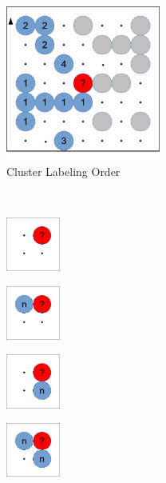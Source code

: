 \begin{figure}
	\centering
	\begin{subfigure}{0.45\textwidth}
		\centering
		\includegraphics[width=2.0in]{17.Metropolis/cluster_labeling.pdf}
		\caption{Cluster Labeling Order}
		\label{fig:cluster_label}
	\end{subfigure}
\\
	\begin{subfigure}{0.15\textwidth}
		\centering
		\includegraphics[width=0.7in]{17.Metropolis/cluster_new.pdf}
		\caption{ }
		\label{fig:cluster_new}
	\end{subfigure}
	\begin{subfigure}{0.15\textwidth}
		\centering
		\includegraphics[width=0.7in]{17.Metropolis/cluster_left.pdf}
		\caption{ }
		\label{fig:cluster_left}
	\end{subfigure}
	\begin{subfigure}{0.15\textwidth}
		\centering
		\includegraphics[width=0.7in]{17.Metropolis/cluster_down.pdf}
		\caption{}
		\label{fig:cluster_down}
	\end{subfigure}
	\begin{subfigure}{0.15\textwidth}
		\centering
		\includegraphics[width=0.7in]{17.Metropolis/cluster_merge1.pdf}

\end{subfigure}
\end{figure}
